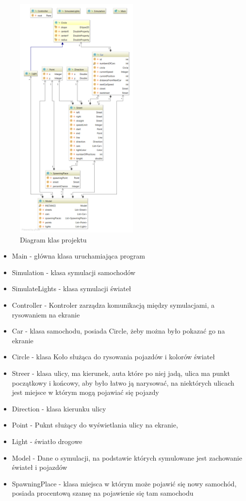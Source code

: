 \documentclass{sprawozdanie-agh}
\begin{document}
	\begin{figure}[H]
		\centering
		\captionsetup{justification=centering}
		\includegraphics[width=0.55\textwidth]{uml}
		\caption{Diagram klas projektu}
		\label{fig:klasy}
	\end{figure}

	\begin{itemize}
		\item Main - główna klasa uruchamiająca program
		\item Simulation - klasa symulacji samochodów
		\item SimulateLights - klasa symulacji świateł
		\item Controller - Kontroler zarządza komunikacją między symulacjami, a rysowaniem na ekranie
		\item Car - klasa samochodu, posiada Circle, żeby można było pokazać go na ekranie
		\item Circle - klasa Koło służąca do rysowania pojazdów i kolorów świateł
		\item Streer - klasa ulicy, ma kierunek, auta które po niej jadą, ulica ma punkt początkowy i końcowy, aby było łatwo ją narysować, na niektórych ulicach jest miejsce w którym mogą pojawiać się pojazdy
		\item Direction - klasa kierunku ulicy
		\item Point - Puknt służący do wyświetlania ulicy na ekranie,
		\item Light - światło drogowe
		\item Model - Dane o symulacji, na podstawie których symulowane jest zachowanie świateł i pojazdów
		\item SpawningPlace - klasa miejsca w którym może pojawić się nowy samochód, posiada procentową szansę na pojawienie się tam samochodu
	\end{itemize}
\end{document}
